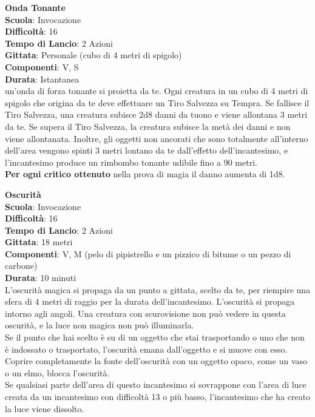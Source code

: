 \begin{multicols}{2}
\medskip\textbf{Onda Tonante}\\
\textbf{Scuola}: Invocazione\\
\textbf{Difficoltà}: 16\\
\textbf{Tempo di Lancio}: 2 Azioni\\
\textbf{Gittata}: Personale (cubo di 4 metri di spigolo)\\
\textbf{Componenti}: V, S\\
\textbf{Durata}: Istantanea\\
un'onda di forza tonante si proietta da te. Ogni creatura in un cubo di 4 metri di spigolo che origina da te deve effettuare un Tiro Salvezza su Tempra. Se fallisce il Tiro Salvezza, una creatura subisce 2d8 danni da tuono e viene allontana 3 metri da te. Se supera il Tiro Salvezza, la creatura subisce la metà dei danni e non viene allontanata. Inoltre, gli oggetti non ancorati che sono totalmente all'interno dell'area vengono spinti 3 metri lontano da te dall'effetto dell'incantesimo, e l'incantesimo produce un rimbombo tonante udibile fino a 90 metri.\\
\textbf{Per ogni critico ottenuto} nella prova di magia il danno aumenta di 1d8.

\medskip\textbf{Oscurità}\\
\textbf{Scuola}: Invocazione\\
\textbf{Difficoltà}: 16\\
\textbf{Tempo di Lancio}: 2 Azioni\\
\textbf{Gittata}: 18 metri\\
\textbf{Componenti}: V, M (pelo di pipistrello e un pizzico di bitume o un pezzo di carbone)\\
\textbf{Durata}: 10 minuti\\
L'oscurità magica si propaga da un punto a gittata, scelto da te, per riempire una sfera di 4 metri di raggio per la durata dell'incantesimo. L'oscurità si propaga intorno agli angoli. Una creatura con scurovisione non può vedere in questa oscurità, e la luce non magica non può illuminarla.\\
Se il punto che hai scelto è su di un oggetto che stai trasportando o uno che non è indossato o trasportato, l'oscurità emana dall'oggetto e si muove con esso. Coprire completamente la fonte dell'oscurità con un oggetto opaco, come un vaso o un elmo, blocca l'oscurità.\\
Se qualsiasi parte dell'area di questo incantesimo si sovrappone con l'area di luce creata da un incantesimo con difficoltà 13 o più basso, l'incantesimo che ha creato la luce viene dissolto.


\end{multicols}
